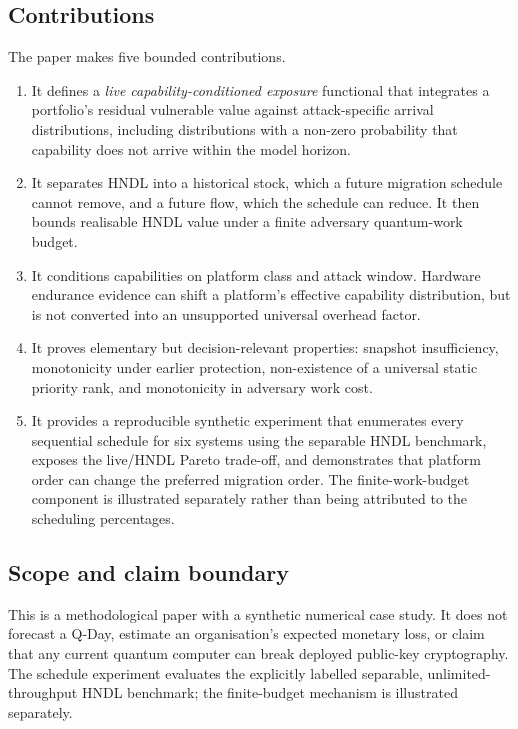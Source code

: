\documentclass[10pt]{article}
\begin{document}
\subsection{Contributions}

The paper makes five bounded contributions.

\begin{enumerate}
\item It defines a \emph{live capability-conditioned exposure} functional that integrates a portfolio's residual vulnerable value against attack-specific arrival distributions, including distributions with a non-zero probability that capability does not arrive within the model horizon.
\item It separates HNDL into a historical stock, which a future migration schedule cannot remove, and a future flow, which the schedule can reduce. It then bounds realisable HNDL value under a finite adversary quantum-work budget.
\item It conditions capabilities on platform class and attack window. Hardware endurance evidence can shift a platform's effective capability distribution, but is not converted into an unsupported universal overhead factor.
\item It proves elementary but decision-relevant properties: snapshot insufficiency, monotonicity under earlier protection, non-existence of a universal static priority rank, and monotonicity in adversary work cost.
\item It provides a reproducible synthetic experiment that enumerates every sequential schedule for six systems using the separable HNDL benchmark, exposes the live/HNDL Pareto trade-off, and demonstrates that platform order can change the preferred migration order. The finite-work-budget component is illustrated separately rather than being attributed to the scheduling percentages.
\end{enumerate}

\subsection{Scope and claim boundary}

This is a methodological paper with a synthetic numerical case study. It does not forecast a Q-Day, estimate an organisation's expected monetary loss, or claim that any current quantum computer can break deployed public-key cryptography. The schedule experiment evaluates the explicitly labelled separable, unlimited-throughput HNDL benchmark; the finite-budget mechanism is illustrated separately.
\end{document}
